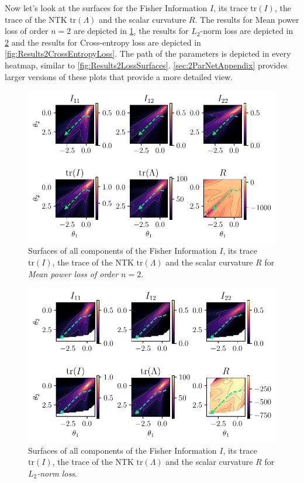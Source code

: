 Now let's look at the surfaces for the Fisher Information $I$, its trace $\mathrm{tr}(I)$, the trace of the NTK $\mathrm{tr}(\Lambda)$ and the scalar curvature $R$. The results for Mean power loss of order $n=2$ are depicted in \cref{fig:Results2MeanPowerLoss}, the results for $L_2$-norm loss are depicted in \cref{fig:Results2LPNormLoss} and the results for Cross-entropy loss are depicted in \cref{fig:Results2CrossEntropyLoss}. The path of the parameters is depicted in every heatmap, similar to \cref{fig:Results2LossSurfaces}. \cref{sec:2ParNetAppendix} provides larger versions of these plots that provide a more detailed view.\\
\begin{figure}
	\centering
	\includegraphics{Experiment2/plots/MeanPowerLoss2_tracecomparison.pdf}
	\caption{Surfaces of all components of the Fisher Information $I$, its trace $\mathrm{tr}(I)$, the trace of the NTK $\mathrm{tr}(\Lambda)$ and the scalar curvature $R$ for \emph{Mean power loss of order $n=2$}.}
	\label{fig:Results2MeanPowerLoss}
\end{figure}

\begin{figure}
	\centering
	\includegraphics{Experiment2/plots/LPNormLoss2_tracecomparison.pdf}
	\caption{Surfaces of all components of the Fisher Information $I$, its trace $\mathrm{tr}(I)$, the trace of the NTK $\mathrm{tr}(\Lambda)$ and the scalar curvature $R$ for \emph{$L_2$-norm loss}.}
	\label{fig:Results2LPNormLoss}
\end{figure}


